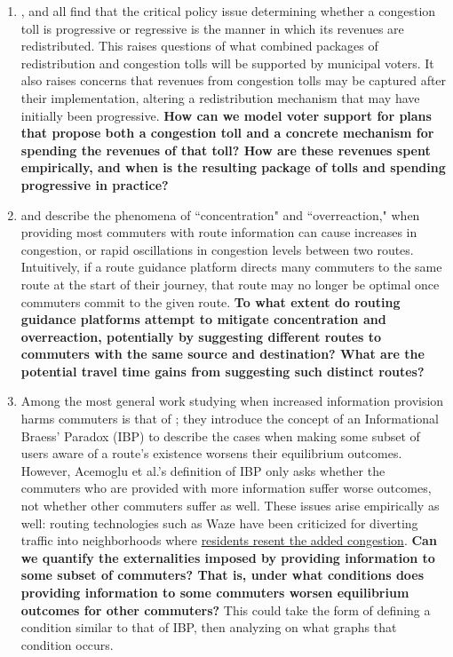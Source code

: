 \documentclass[JEL]{AEA}
\begin{document}
\begin{enumerate}
\item \cite{small-1983}, \cite{arnott-1994} and \cite{eliasson-2006} all find that the critical policy issue determining whether a congestion toll is progressive or regressive is the manner in which its revenues are redistributed. This raises questions of what combined packages of redistribution and congestion tolls will be supported by municipal voters. It also raises concerns that revenues from congestion tolls may be captured after their implementation, altering a redistribution mechanism that may have initially been progressive. \textbf{How can we model voter support for plans that propose both a congestion toll and a concrete mechanism for spending the revenues of that toll? How are these revenues spent empirically, and when is the resulting package of tolls and spending progressive in practice?} 

\item \cite{arnott-1991} and \cite{ben-akiva-1991} describe the phenomena of ``concentration" and ``overreaction," when providing most commuters with route information can cause increases in congestion, or rapid oscillations in congestion levels between two routes. Intuitively, if a route guidance platform directs many commuters to the same route at the start of their journey, that route may no longer be optimal once commuters commit to the given route. \textbf{To what extent do routing guidance platforms attempt to mitigate concentration and overreaction, potentially by suggesting different routes to commuters with the same source and destination? What are the potential travel time gains from suggesting such distinct routes?}

\item Among the most general work studying when increased information provision harms commuters is that of \cite{acemoglu-2016}; they introduce the concept of an Informational Braess' Paradox (IBP) to describe the cases when making some subset of users aware of a route's existence worsens their equilibrium outcomes. However, Acemoglu et al.'s definition of IBP only asks whether the commuters who are provided with more information suffer worse outcomes, not whether other commuters suffer as well. These issues arise empirically as well: routing technologies such as Waze have been criticized for diverting traffic into neighborhoods where \href{https://www.washingtonpost.com/local/traffic-weary-homeowners-and-waze-are-at-war-again-guess-whos-winning/2016/06/05/c466df46-299d-11e6-b989-4e5479715b54_story.html}{residents resent the added congestion}. \textbf{Can we quantify the externalities imposed by providing information to some subset of commuters? That is, under what conditions does providing information to some commuters worsen equilibrium outcomes for other commuters?} This could take the form of defining a condition similar to that of IBP, then analyzing on what graphs that condition occurs.



\end{enumerate}
\end{document}
